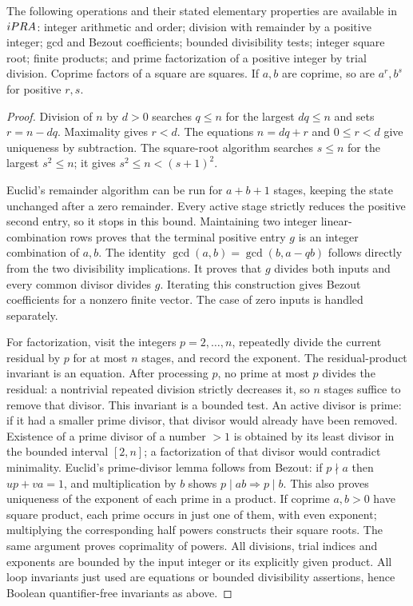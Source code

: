 \begin{lemma}\label{lem:arithmetic}
The following operations and their stated elementary properties are available
in $iPRA$: integer arithmetic and order; division with remainder by a positive
integer; gcd and Bezout coefficients; bounded divisibility tests; integer
square root; finite products; and prime factorization of a positive integer
by trial division. Coprime factors of a square are squares. If $a,b$ are
coprime, so are $a^r,b^s$ for positive $r,s$.
\end{lemma}
\begin{proof}
Division of $n$ by $d>0$ searches $q\le n$ for the largest $dq\le n$ and sets
$r=n-dq$. Maximality gives $r<d$. The equations $n=dq+r$ and $0\le r<d$
give uniqueness by subtraction. The square-root algorithm searches
$s\le n$ for the largest $s^2\le n$; it gives
$s^2\le n<(s+1)^2$.

Euclid's remainder algorithm can be run for $a+b+1$ stages, keeping the state
unchanged after a zero remainder. Every active stage strictly reduces the
positive second entry, so it stops in this bound. Maintaining two integer
linear-combination rows proves that the terminal positive entry $g$ is an
integer combination of $a,b$. The identity
$\gcd(a,b)=\gcd(b,a-qb)$ follows directly from the two divisibility
implications. It proves that $g$ divides both inputs and every common divisor
divides $g$. Iterating this construction gives Bezout coefficients for a
nonzero finite vector. The case of zero inputs is handled separately.

For factorization, visit the integers $p=2,\ldots,n$, repeatedly divide the
current residual by $p$ for at most $n$ stages, and record the exponent.
The residual-product invariant is an equation. After processing $p$, no
prime at most $p$ divides the residual: a nontrivial repeated division
strictly decreases it, so $n$ stages suffice to remove that divisor.
This invariant is a bounded test. An active divisor is prime:
if it had a smaller prime divisor, that divisor would already have been
removed. Existence of a prime divisor of a number $>1$ is obtained by its
least divisor in the bounded interval $[2,n]$; a factorization of that divisor
would contradict minimality. Euclid's prime-divisor lemma follows from
Bezout: if $p\nmid a$ then $up+va=1$, and multiplication by $b$ shows
$p\mid ab\Rightarrow p\mid b$. This also proves uniqueness of the exponent
of each prime in a product. If coprime $a,b>0$ have square product, each prime
occurs in just one of them, with even exponent; multiplying the corresponding
half powers constructs their square roots. The same argument proves
coprimality of powers. All divisions, trial indices and exponents are bounded
by the input integer or its explicitly given product. All loop invariants
just used are equations or bounded divisibility assertions, hence Boolean
quantifier-free invariants as above.
\end{proof}

